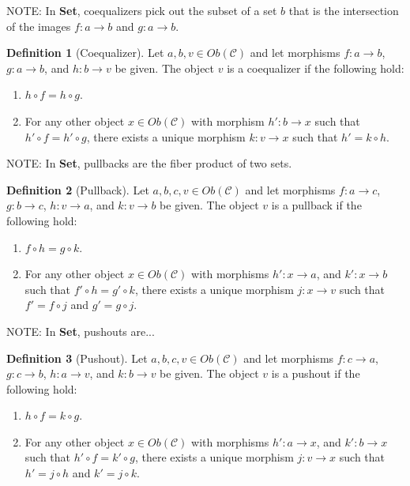 \documentclass{article}
\theoremstyle{definition}
\newtheorem{definition}{Definition}
\begin{document}
NOTE: In \textbf{Set}, coequalizers pick out the subset of a set $b$ that is the intersection of the images $f:a\rightarrow b$ and $g:a\rightarrow b$.
\begin{definition}[Coequalizer]
    Let $a,b,v\in Ob(\mathcal{C})$ and let morphisms $f:a\rightarrow b$, $g:a\rightarrow b$, and $h:b\rightarrow v$ be given.
    The object $v$ is a coequalizer if the following hold:
    \begin{enumerate}
        \item $h\circ f=h\circ g$.
        \item For any other object $x\in Ob(\mathcal{C})$ with morphism $h':b\rightarrow x$ such that $h'\circ f=h'\circ g$, there exists a unique morphism $k:v\rightarrow x$ such that $h'=k\circ h$.
    \end{enumerate}
\end{definition}

NOTE: In \textbf{Set}, pullbacks are the fiber product of two sets.
\begin{definition}[Pullback]
    Let $a, b, c, v\in Ob(\mathcal{C})$ and let morphisms $f:a\rightarrow c$, $g:b\rightarrow c$, $h:v\rightarrow a$, and $k:v\rightarrow b$ be given.
    The object $v$ is a pullback if the following hold:
    \begin{enumerate}
        \item $f\circ h=g\circ k$.
        \item For any other object $x\in Ob(\mathcal{C})$ with morphisms $h':x\rightarrow a$, and $k':x\rightarrow b$ such that $f'\circ h=g'\circ k$, there exists a unique morphism $j:x\rightarrow v$ such that $f'=f\circ j$ and $g'=g\circ j$.
    \end{enumerate}
\end{definition}

NOTE: In \textbf{Set}, pushouts are...
\begin{definition}[Pushout]
    Let $a, b, c, v\in Ob(\mathcal{C})$ and let morphisms $f:c\rightarrow a$, $g:c\rightarrow b$, $h:a\rightarrow v$, and $k:b\rightarrow v$ be given.
    The object $v$ is a pushout if the following hold:
    \begin{enumerate}
        \item $h\circ f=k\circ g$.
        \item For any other object $x\in Ob(\mathcal{C})$ with morphisms $h':a\rightarrow x$, and $k':b\rightarrow x$ such that $h'\circ f=k'\circ g$, there exists a unique morphism $j:v\rightarrow x$ such that $h'=j\circ h$ and $k'=j\circ k$.
    \end{enumerate}
\end{definition}
\end{document}
